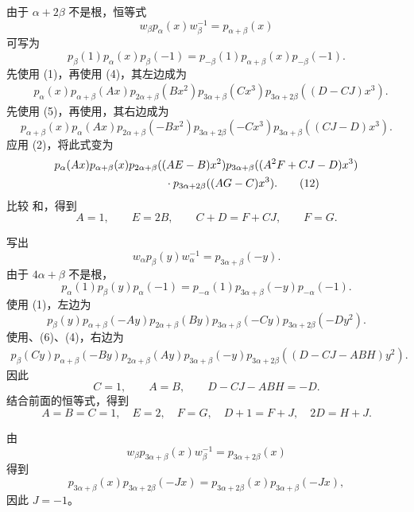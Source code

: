 由于 \(\alpha+2\beta\) 不是根，恒等式
\[
  w_\beta p_\alpha(x)w_\beta^{-1}=p_{\alpha+\beta}(x)
\]
可写为
\begin{equation}
  p_\beta(1)p_\alpha(x)p_\beta(-1)
   =p_{-\beta}(1)p_{\alpha+\beta}(x)p_{-\beta}(-1).
  \tag{9}\label{sga3:XXIII:3.4:eq9}
\end{equation}
先使用 (1)，再使用 (4)，其左边成为
\begin{align}
 &p_\alpha(x)p_{\alpha+\beta}(Ax)p_{2\alpha+\beta}(Bx^2)
   p_{3\alpha+\beta}(Cx^3)
   p_{3\alpha+2\beta}((D-CJ)x^3). \tag{10}\label{sga3:XXIII:3.4:eq10}
\end{align}
先使用 (5)，再使用，其右边成为
\[
 p_{\alpha+\beta}(x)p_\alpha(Ax)p_{2\alpha+\beta}(-Bx^2)
 p_{3\alpha+2\beta}(-Cx^3)p_{3\alpha+\beta}((CJ-D)x^3).
\]
应用 (2)，将此式变为
\begin{align}
 &p_\alpha(Ax)p_{\alpha+\beta}(x)
 p_{2\alpha+\beta}((AE-B)x^2)
 p_{3\alpha+\beta}((A^2F+CJ-D)x^3)\notag\\
 &\hspace{35mm}\cdot
 p_{3\alpha+2\beta}((AG-C)x^3). \tag{12}\label{sga3:XXIII:3.4:eq12}
\end{align}
比较 和，得到
\[
  A=1,\qquad E=2B,\qquad C+D=F+CJ,\qquad F=G.
\]

写出
\[
  w_\alpha p_\beta(y)w_\alpha^{-1}=p_{3\alpha+\beta}(-y).
\]
由于 \(4\alpha+\beta\) 不是根，
\begin{equation}
 p_\alpha(1)p_\beta(y)p_\alpha(-1)
  =p_{-\alpha}(1)p_{3\alpha+\beta}(-y)p_{-\alpha}(-1).
 \tag{13}\label{sga3:XXIII:3.4:eq13}
\end{equation}
使用 (1)，左边为
\[
 p_\beta(y)p_{\alpha+\beta}(-Ay)p_{2\alpha+\beta}(By)
 p_{3\alpha+\beta}(-Cy)p_{3\alpha+2\beta}(-Dy^2).
\]
使用、(6)、(4)，右边为
\[
\begin{aligned}
 p_\beta(Cy)p_{\alpha+\beta}(-By)p_{2\alpha+\beta}(Ay)
 p_{3\alpha+\beta}(-y)
 p_{3\alpha+2\beta}((D-CJ-ABH)y^2).
\end{aligned}
\]
因此
\[
  C=1,\qquad A=B,\qquad D-CJ-ABH=-D.
\]
结合前面的恒等式，得到
\[
 A=B=C=1,\quad E=2,\quad F=G,\quad
 D+1=F+J,\quad 2D=H+J.
\]

由
\[
  w_\beta p_{3\alpha+\beta}(x)w_\beta^{-1}
    =p_{3\alpha+2\beta}(x)
\]
得到
\[
  p_{3\alpha+\beta}(x)p_{3\alpha+2\beta}(-Jx)
   =p_{3\alpha+2\beta}(x)p_{3\alpha+\beta}(-Jx),
\]
因此 \(J=-1\)。

